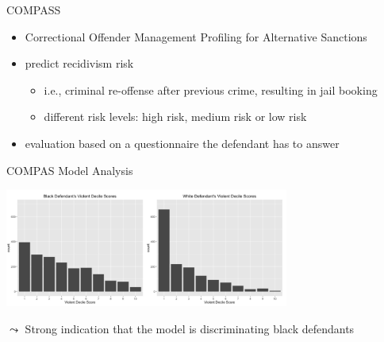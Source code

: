 \documentclass[aspectratio=169]{../latex_main/tntbeamer}  %
\begin{document}
\begin{frame}[c]{COMPASS}

    \begin{itemize}
        \item Correctional Offender Management Profiling for Alternative Sanctions 
        \item predict recidivism risk
        \begin{itemize}
            \item i.e., criminal re-offense after previous crime, resulting in jail booking
            \item different risk levels: high risk, medium risk or low risk
        \end{itemize}
        \item evaluation based on a questionnaire the defendant has to answer
    \end{itemize}	
	
\end{frame}

\begin{frame}[c]{COMPAS Model Analysis~}
    
    \centering
    \includegraphics[width=0.7\textwidth]{01_introduction/figure/compass_black_white.PNG}
	
	$\leadsto$ Strong indication that the model is discriminating black defendants
	
\end{frame}
\end{document}
